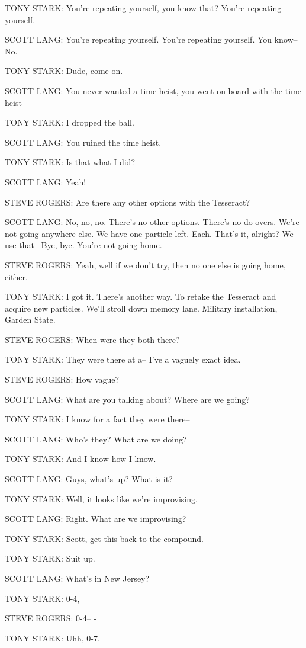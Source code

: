 TONY STARK: You're repeating yourself, you know that? You're repeating yourself.

SCOTT LANG: You're repeating yourself. You're repeating yourself. You know– No.

TONY STARK: Dude, come on.

SCOTT LANG: You never wanted a time heist, you went on board with the time heist–

TONY STARK: I dropped the ball.

SCOTT LANG: You ruined the time heist.

TONY STARK: Is that what I did?

SCOTT LANG: Yeah!

STEVE ROGERS: Are there any other options with the Tesseract?

SCOTT LANG: No, no, no. There's no other options. There's no do-overs. We're not going anywhere else. We have one particle left. Each. That's it, alright? We use that– Bye, bye. You're not going home.

STEVE ROGERS: Yeah, well if we don't try, then no one else is going home, either.

TONY STARK: I got it. There's another way. To retake the Tesseract and acquire new particles. We'll stroll down memory lane. Military installation, Garden State.

STEVE ROGERS: When were they both there?

TONY STARK: They were there at a– I've a vaguely exact idea.

STEVE ROGERS: How vague?

SCOTT LANG: What are you talking about? Where are we going?

TONY STARK: I know for a fact they were there–

SCOTT LANG: Who's they? What are we doing?

TONY STARK: And I know how I know.

SCOTT LANG: Guys, what's up? What is it?

TONY STARK: Well, it looks like we're improvising.

SCOTT LANG: Right. What are we improvising?

TONY STARK: Scott, get this back to the compound.

TONY STARK: Suit up.

SCOTT LANG: What's in New Jersey?

TONY STARK: 0-4,

STEVE ROGERS: 0-4– -

TONY STARK: Uhh, 0-7.

